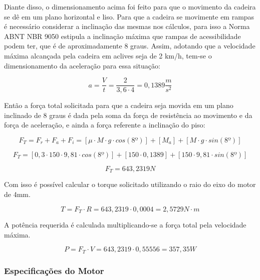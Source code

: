 Diante disso, o dimensionamento acima foi feito para que o 
movimento da cadeira se dê em um plano horizontal e liso. 
Para que a cadeira se movimente em rampas é necessário considerar 
a inclinação das mesmas nos cálculos, para isso a Norma ABNT NBR 9050 \cite{nbr9050}
estipula a inclinação máxima que rampas de acessibilidade 
podem ter, que é de aproximadamente 8 graus. Assim, adotando que a velocidade 
máxima alcançada pela cadeira em aclives seja de 2 km/h, tem-se o 
dimensionamento da aceleração para essa situação: 

\begin{equation}
a = \frac{V}{t} = \frac{2}{3,6 \cdot 4} = 0,1389 \frac{m}{s^2}
\end{equation}

Então a força total solicitada para que a cadeira seja movida 
em um plano inclinado de 8 graus é dada pela soma da força de resistência 
ao movimento e da força de aceleração, e ainda a força referente a inclinação do piso:

\begin{equation}
F_{T} = F_{r} + F_{a} + F_{i} = [\mu \cdot M \cdot g \cdot cos(8º)] + [M_{a}] + [M \cdot g \cdot sin(8º)]
\end{equation}

\begin{equation}
F_{T} = [0,3 \cdot 150 \cdot 9,81 \cdot cos(8º)] + [150 \cdot 0,1389] + [150 \cdot 9,81 \cdot sin(8º)]
\end{equation}

\begin{equation}
F_{T} = 643,2319 N
\end{equation}

Com isso é possível calcular o torque solicitado utilizando o raio do eixo do motor de 4mm.

\begin{equation}
T = F_{T} \cdot R = 643,2319 \cdot 0,0004 = 2,5729 N \cdot m
\end{equation}

A potência requerida é calculada multiplicando-se a força total pela velocidade máxima.

\begin{equation}
P = F_{T} \cdot V = 643,2319 \cdot 0,55556 = 357,35 W
\end{equation}

\subsubsection{Especificações do Motor}

